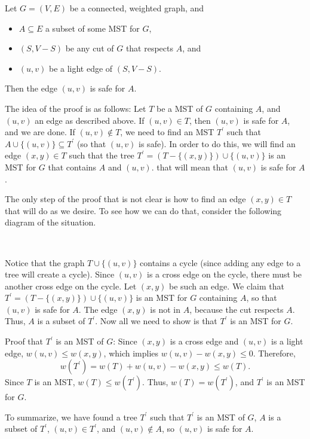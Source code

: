 \begin{thm}\label{thm:mst0}
Let $G\!=\!(V,E)$ be a connected, weighted graph, and 
	\begin{itemize}
	\item
	$A\subseteq E$ a subset of some MST for $G$,
	\item
	$(S,V-S)$ be any cut of $G$ that respects $A$, and
	\item
	$(u,v)$ be a light edge of $(S,V-S)$.
	\end{itemize}
Then the edge $(u,v)$ is safe for $A$.
\begin{pf}
The idea of the proof is as follows: 
Let $T$ be a MST of $G$ containing $A$, 
and $(u,v)$ an edge as described above.  
If $(u,v)\in T$, then $(u,v)$ is safe for $A$, and we are done.
If $(u,v)\not\in T$, we need to find an MST $T^{\prime}$ such that 
$A\cup\{(u,v)\}\subseteq T^{\prime}$ (so that $(u,v)$ is safe).
In order to do this, we will find an edge $(x,y)\in T$ such that the tree
$T^{\prime}=(T-\{(x,y)\})\cup\{(u,v)\}$ is an MST for $G$ that
contains $A$ and $(u,v)$.
that will mean that $(u,v)$ is safe for $A$.

The only step of the proof that is not clear is how to find
an edge $(x,y)\in T$ that will do as we desire. 
To see how we can do that,
consider the following diagram of the situation.

\ \ \ \ \ \ 

Notice that the graph $T\cup\{(u,v)\}$ contains a cycle
(since adding any edge to a tree will create a cycle).
Since $(u,v)$ is a cross edge on the cycle, there must
be another cross edge on the cycle.
Let $(x,y)$ be such an edge.
We claim that 
$T^{\prime}=(T-\{(x,y)\})\cup\{(u,v)\}$ is an MST for $G$
containing $A$, so that $(u,v)$ is safe for $A$.
The edge $(x,y)$ is not in $A$, because the cut respects $A$.
Thus, $A$ is a subset of $T^{\prime}$.
Now all we need to show is that $T^{\prime}$ is an MST for $G$.

Proof that $T^{\prime}$ is an MST of $G$: 
Since $(x,y)$ is a cross edge and $(u,v)$ is a 
light edge,
$w(u,v)\leq w(x,y)$, which implies $w(u,v) - w(x,y)\leq 0$.
Therefore,  
$$w(T^{\prime})=w(T) +  w(u,v) - w(x,y)\leq w(T).$$
Since $T$ is an MST, $w(T)\leq w(T^{\prime})$.
Thus, $w(T)=w(T^{\prime})$, and $T^{\prime}$ is an MST for $G$.

To summarize, we have found a tree $T^{\prime}$ such that
$T^{\prime}$ is an MST of $G$,
$A$ is a subset of $T^{\prime}$,
$(u,v)\in T^{\prime}$, and $(u,v)\not\in A$, so 
$(u,v)$ is safe for $A$.
\end{pf}
\end{thm}


